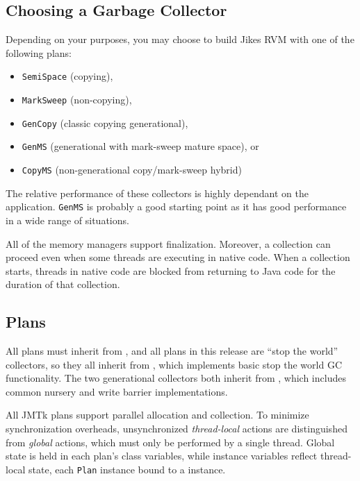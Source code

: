 \subsection{Choosing a Garbage Collector} \label{ssec:choosinggc}

Depending on your purposes, you may choose to build Jikes RVM with one
of the following plans:
\begin{itemize}
\item \texttt{SemiSpace} (copying),
\item \texttt{MarkSweep} (non-copying),
\item \texttt{GenCopy} (classic copying generational),
\item \texttt{GenMS} (generational with mark-sweep mature space), or
\item \texttt{CopyMS} (non-generational copy/mark-sweep hybrid)
\end{itemize}
The relative performance of these collectors is highly dependant on
the application.  \texttt{GenMS} is probably a good starting point as
it has good performance in a wide range of situations.

All of the memory managers support finalization.  Moreover, a
collection can proceed even when some threads are executing in native
code. When a collection starts, threads in native code are blocked
from returning to Java code for the duration of that collection.

\subsection{Plans} \label{sssec:plans}

All plans must inherit from
, and all plans in
this release are ``stop the world'' collectors, so they all inherit
from , which
implements basic stop the world GC functionality.  The two
generational collectors both inherit from
, which includes
common nursery and write barrier implementations.

All JMTk plans support parallel allocation and collection.  To
minimize synchronization overheads, unsynchronized \emph{thread-local}
actions are distinguished from \emph{global} actions, which must only
be performed by a single thread.  Global state is held in each plan's
class variables, while instance variables reflect thread-local state,
each \texttt{Plan} instance bound to a
 instance.

